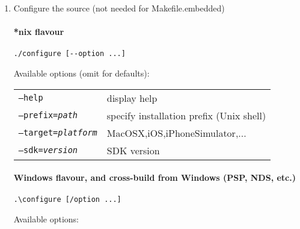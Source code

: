 \begin{enumerate}
\item Configure the source (not needed for Makefile.embedded)

\paragraph{*nix flavour}
\begin{lstlisting}
./configure [--option ...]
\end{lstlisting}

Available options (omit for defaults):

\begin{tabular}{ll}	
{\tt --help}                  & display help                             \\
{\tt --prefix={\it path}}     & specify installation prefix (Unix shell) \\
{\tt --target={\it platform}} & MacOSX,iOS,iPhoneSimulator,...           \\
{\tt --sdk={\it version}}     & SDK version                              \\
\end{tabular}

\paragraph{Windows flavour, and cross-build from Windows (PSP, NDS, etc.)}

\begin{lstlisting}
.\configure [/option ...]
\end{lstlisting}

Available options:


\end{enumerate}
